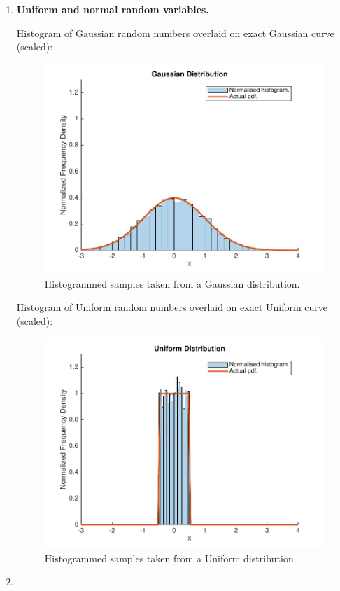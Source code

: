 \documentclass[12pt]{article}
\begin{document}
\begin{enumerate}
\item {\bf Uniform and normal random variables.}

Histogram of Gaussian random numbers overlaid on exact Gaussian curve (scaled):
 

\begin{figure}[H]
\includegraphics[width=\textwidth]{figures/gaussian-histogram.pdf}
  \caption{Histogrammed samples taken from a Gaussian distribution.}
  \label{fig:gaussian-histogram}
\end{figure}

Histogram of Uniform random numbers overlaid on exact Uniform curve (scaled):


\begin{figure}[H]
\includegraphics[width=\textwidth]{figures/uniform-histogram.pdf}
  \caption{Histogrammed samples taken from a Uniform distribution.}
\end{figure}
\item 




\end{enumerate}
\end{document}
